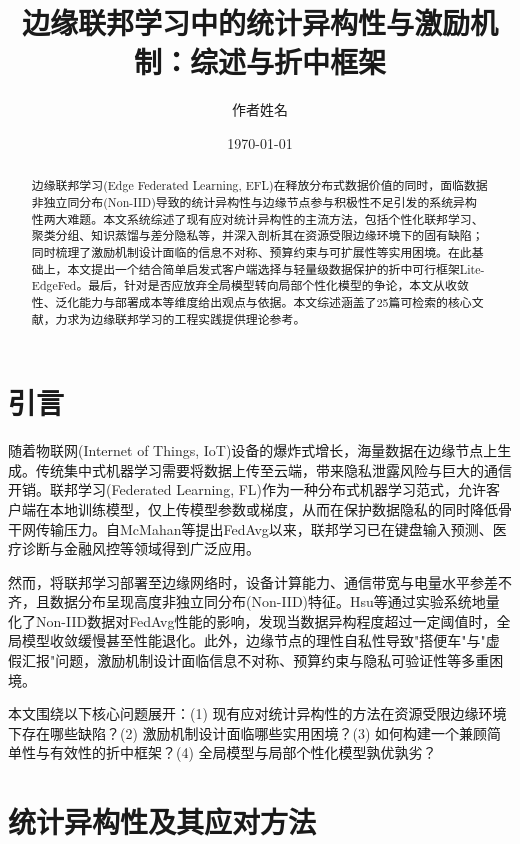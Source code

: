 \documentclass[a4paper,12pt]{article}
\title{\textbf{边缘联邦学习中的统计异构性与激励机制：综述与折中框架}}
\author{作者姓名}
\date{\today}
\begin{document}
\maketitle

\begin{abstract}
边缘联邦学习(Edge Federated Learning, EFL)在释放分布式数据价值的同时，面临数据非独立同分布(Non-IID)导致的统计异构性与边缘节点参与积极性不足引发的系统异构性两大难题。本文系统综述了现有应对统计异构性的主流方法，包括个性化联邦学习、聚类分组、知识蒸馏与差分隐私等，并深入剖析其在资源受限边缘环境下的固有缺陷；同时梳理了激励机制设计面临的信息不对称、预算约束与可扩展性等实用困境。在此基础上，本文提出一个结合简单启发式客户端选择与轻量级数据保护的折中可行框架Lite-EdgeFed。最后，针对是否应放弃全局模型转向局部个性化模型的争论，本文从收敛性、泛化能力与部署成本等维度给出观点与依据。本文综述涵盖了25篇可检索的核心文献，力求为边缘联邦学习的工程实践提供理论参考。
\end{abstract}

\section{引言}

随着物联网(Internet of Things, IoT)设备的爆炸式增长，海量数据在边缘节点上生成。传统集中式机器学习需要将数据上传至云端，带来隐私泄露风险与巨大的通信开销。联邦学习(Federated Learning, FL)\cite{mcmahan2017communication}作为一种分布式机器学习范式，允许客户端在本地训练模型，仅上传模型参数或梯度，从而在保护数据隐私的同时降低骨干网传输压力。自McMahan等提出FedAvg以来，联邦学习已在键盘输入预测、医疗诊断与金融风控等领域得到广泛应用。

然而，将联邦学习部署至边缘网络时，设备计算能力、通信带宽与电量水平参差不齐，且数据分布呈现高度非独立同分布(Non-IID)特征。Hsu等\cite{hsu2019measuring}通过实验系统地量化了Non-IID数据对FedAvg性能的影响，发现当数据异构程度超过一定阈值时，全局模型收敛缓慢甚至性能退化。此外，边缘节点的理性自私性导致"搭便车"与"虚假汇报"问题，激励机制设计面临信息不对称、预算约束与隐私可验证性等多重困境\cite{zhan2020learning,sarikaya2020motivating}。

本文围绕以下核心问题展开：(1) 现有应对统计异构性的方法在资源受限边缘环境下存在哪些缺陷？(2) 激励机制设计面临哪些实用困境？(3) 如何构建一个兼顾简单性与有效性的折中框架？(4) 全局模型与局部个性化模型孰优孰劣？

\section{统计异构性及其应对方法}
\end{document}
